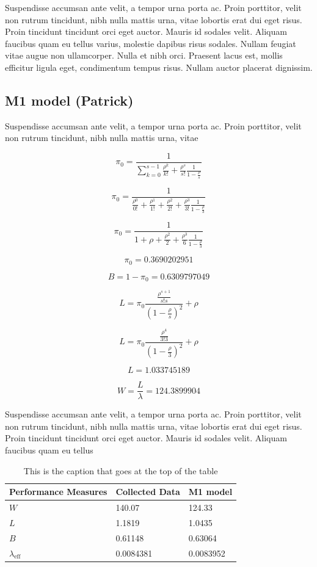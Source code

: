 \documentclass{article}
\begin{document}
Suspendisse accumsan ante velit, a tempor urna porta ac. Proin porttitor, velit non rutrum tincidunt, nibh nulla mattis urna, vitae lobortis erat dui eget risus. Proin tincidunt tincidunt orci eget auctor. Mauris id sodales velit. Aliquam faucibus quam eu tellus varius, molestie dapibus risus sodales. Nullam feugiat vitae augue non ullamcorper. Nulla et nibh orci. Praesent lacus est, mollis efficitur ligula eget, condimentum tempus risus. Nullam auctor placerat dignissim.

\subsection{M1 model (Patrick)}

Suspendisse accumsan ante velit, a tempor urna porta ac. Proin porttitor, velit non rutrum tincidunt, nibh nulla mattis urna, vitae 

$$
\pi_{0} = \frac{1}{\sum_{k=0}^{s-1}{\frac{\rho^k}{k!}} + \frac{\rho^s}{s!}\frac{1}{1-\frac{\rho}{s}}}
$$

$$
\pi_{0} = \frac{1}{\frac{\rho^0}{0!} + \frac{\rho^1}{1!} + \frac{\rho^2}{2!} + \frac{\rho^3}{3!}\frac{1}{1-\frac{\rho}{3}}}
$$

$$
\pi_{0} = \frac{1}{1 + \rho + \frac{\rho^2}{2} + \frac{\rho^3}{6}\frac{1}{1-\frac{\rho}{3}}}
$$

$$
\pi_{0} = 0.3690202951
$$

$$
B = 1-\pi_{0} = 0.6309797049
$$

$$
L = \pi_{0}\frac{\frac{\rho^{s+1}}{s!s}}{(1-\frac{\rho}{s})^2}+\rho
$$

$$
L = \pi_{0}\frac{\frac{\rho^{4}}{3!3}}{(1-\frac{\rho}{3})^2}+\rho
$$

$$
L = 1.033745189
$$

$$
W = \frac{L}{\lambda} = 124.3899904
$$



Suspendisse accumsan ante velit, a tempor urna porta ac. Proin porttitor, velit non rutrum tincidunt, nibh nulla mattis urna, vitae lobortis erat dui eget risus. Proin tincidunt tincidunt orci eget auctor. Mauris id sodales velit. Aliquam faucibus quam eu tellus

\begin{table}[h!]
    \centering
    \caption{This is the caption that goes at the top of the table}
    \begin{tabu}{*{3}{X[c]}}
        \toprule
        \textbf{Performance Measures} & \textbf{Collected Data} & \textbf{M1 model}\\
        \midrule
        $W$ & 140.07 & 124.33\\
        $L$ & 1.1819 & 1.0435\\
        $B$ & 0.61148 & 0.63064\\
        $\lambda_{\text{eff}}$ & 0.0084381 & 0.0083952\\
        \bottomrule
    \end{tabu}
    \label{tab:M1}
\end{table}
\end{document}
